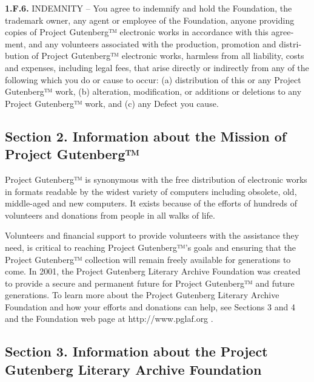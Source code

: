 \documentclass[a5paper]{book}
\begin{document}
\begin{german}
\begin{english}
\begin{pgfooter_env}
{\bfseries{1.F.6.}} INDEMNITY – You agree to indemnify and hold the Foundation,
the trademark owner, any agent or employee of the Foundation, anyone
providing copies of Project Gutenberg™ electronic works in accordance
with this agreement, and any volunteers associated with the
production, promotion and distribution of Project Gutenberg™
electronic works, harmless from all liability, costs and expenses,
including legal fees, that arise directly or indirectly from any of
the following which you do or cause to occur: (a) distribution of this
or any Project Gutenberg™ work, (b) alteration, modification, or
additions or deletions to any Project Gutenberg™ work, and (c) any
Defect you cause.\par

%
\label{section-2-information-about-the-mission-of-project-gutenberg}%
\hypertarget{section-2-information-about-the-mission-of-project-gutenberg}{}%
%
\subsection*{Section 2. Information about the Mission of Project Gutenberg™}


Project Gutenberg™ is synonymous with the free distribution of
electronic works in formats readable by the widest variety of
computers including obsolete, old, middle-aged and new computers. It
exists because of the efforts of hundreds of volunteers and donations
from people in all walks of life.\par

Volunteers and financial support to provide volunteers with the
assistance they need, is critical to reaching Project Gutenberg™’s
goals and ensuring that the Project Gutenberg™ collection will remain
freely available for generations to come. In 2001, the Project
Gutenberg Literary Archive Foundation was created to provide a secure
and permanent future for Project Gutenberg™ and future generations. To
learn more about the Project Gutenberg Literary Archive Foundation and
how your efforts and donations can help, see Sections 3 and 4 and the
Foundation web page at {http://www.pglaf.org} .\par

%
\label{section-3-information-about-the-project-gutenberg-literary-archive-foundation}%
\hypertarget{section-3-information-about-the-project-gutenberg-literary-archive-foundation}{}%
%
\subsection*{Section 3. Information about the Project Gutenberg Literary Archive Foundation}



\end{pgfooter_env}
\end{english}
\end{german}
\end{document}
